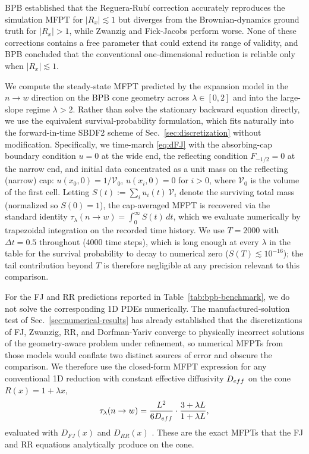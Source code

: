 \documentclass[11pt]{article}
\begin{document}
BPB established that the Reguera-Rub\'{i} correction accurately reproduces the simulation MFPT for $|R_x| \lesssim 1$ but diverges from the Brownian-dynamics ground truth for $|R_x| > 1$, while  Zwanzig and Fick-Jacobs perform worse. None of these corrections contains a free parameter that could extend its range of validity, and BPB concluded that the conventional one-dimensional reduction is reliable only when $|R_x| \lesssim 1$.

We compute the steady-state MFPT predicted by the expansion model in the $n \to w$ direction on the BPB cone geometry across $\lambda \in [0, 2]$ and into the large-slope regime $\lambda > 2$. Rather than solve the stationary backward equation directly, we use the equivalent survival-probability formulation, which fits naturally into the forward-in-time SBDF2 scheme of Sec.~\ref{sec:discretization} without modification. Specifically, we time-march \eqref{eq:dFJ} with the absorbing-cap boundary condition $u = 0$ at the wide end, the reflecting condition $F_{-1/2} = 0$ at the narrow end, and initial data concentrated as a unit mass on the reflecting (narrow) cap: $u(x_0, 0) = 1/\mathcal{V}_0$, $u(x_i, 0) = 0$ for $i > 0$, where $\mathcal{V}_0$ is the volume of the first cell. Letting $S(t) := \sum_i u_i(t)\, \mathcal{V}_i$ denote the surviving total mass (normalized so $S(0) = 1$), the cap-averaged MFPT is recovered via the standard identity $\tau_\lambda(n \to w) = \int_0^\infty S(t)\, dt$, which we evaluate numerically by trapezoidal integration on the recorded time history. We use $T = 2000$ with $\Delta t = 0.5$ throughout (4000 time steps), which is long enough at every $\lambda$ in the table for the survival probability to decay to numerical zero ($S(T) \lesssim 10^{-16}$); the tail contribution beyond $T$ is therefore negligible at any precision relevant to this comparison.

For the FJ and RR predictions reported in Table~\ref{tab:bpb-benchmark}, we do not solve the corresponding 1D PDEs numerically. The manufactured-solution test of Sec.~\ref{sec:numerical-results} has already established that the discretizations of FJ, Zwanzig, RR, and Dorfman-Yariv converge to physically incorrect solutions of the geometry-aware problem under refinement, so numerical MFPTs from those models would conflate two distinct sources of error and obscure the comparison. We therefore use the closed-form MFPT expression \cite{BPB2007} for any conventional 1D reduction with constant effective diffusivity $D_{\rm eff}$ on the cone $R(x) = 1 + \lambda x$,
\begin{equation}
    \tau_\lambda(n \to w) = \frac{L^2}{6 D_{\rm eff}} \cdot \frac{3 + \lambda L}{1 + \lambda L}, \label{eq:bpb-mfpt-formulas}
\end{equation}
evaluated with $D_{FJ}(x)$ and $D_{RR}(x)$ \cite{BPB2007}. These are the exact MFPTs that the FJ and RR equations analytically produce on the cone.
\end{document}
